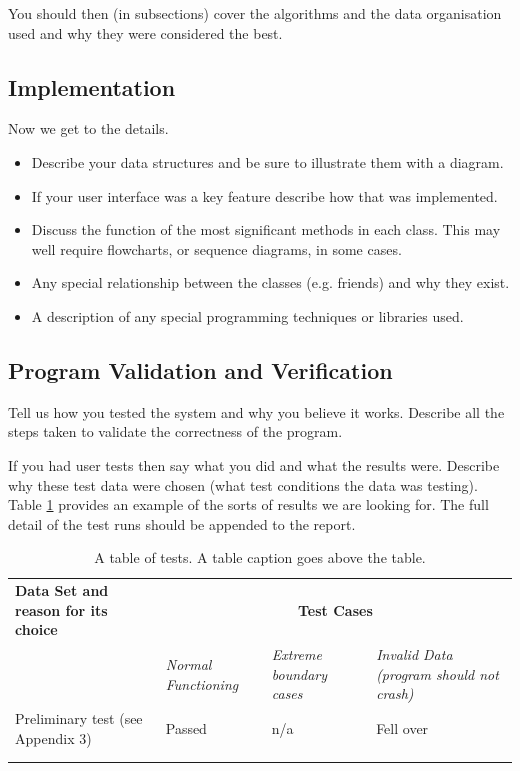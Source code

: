\documentclass[11pt,a4paper]{article}
\begin{document}
You should then (in subsections) cover the algorithms and the data
organisation used and why they were considered the best. 

\subsection{Implementation}

Now we get to the details. 

\begin{itemize}
\item Describe your data structures and be sure to illustrate them
  with a diagram.

\item If your user interface was a key feature describe how that was
  implemented.

\item Discuss the function of the most significant methods in each
  class. This may well require flowcharts, or sequence diagrams, in
  some cases.

\item Any special relationship between the classes (e.g. friends) and
  why they exist.

\item A description of any special programming techniques or libraries
  used.
\end{itemize}

\subsection{Program Validation and Verification}
\label{ss:progr-valid-verif}

Tell us how you tested the system and why you believe it works.
Describe all the steps taken to validate the correctness of the
program.

If you had user tests then say what you did and what the results
were. Describe why these test data were chosen (what test conditions
the data was testing).  Table \ref{tab:tests} provides an example of
the sorts of results we are looking for. The full detail of the test
runs should be appended to the report.

\begin{table}[h!]
  \centering
\caption{A table of tests. A table caption goes above the table.}

  \begin{tabular}[t]{|p{5cm}|p{3cm}|p{3cm}|p{3cm}|} \hline \textbf{Data Set
    and reason for its choice} & \multicolumn{3}{c|}{\textbf{Test Cases}}\\
    \cline{2-4} & \emph{Normal Functioning} & \emph{Extreme boundary cases} &
    \emph{Invalid Data (program should not crash)} \\ \hline Preliminary test
    (see Appendix 3) & Passed & n/a & Fell over \\\hline &&&\\ \hline
    &&&\\ \hline
  \end{tabular}

\label{tab:tests}
\end{table}
\end{document}
